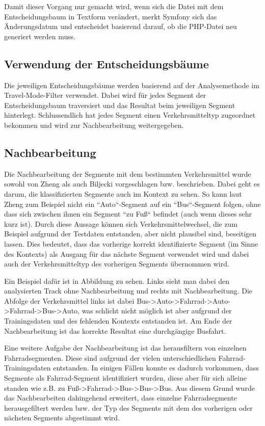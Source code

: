 Damit dieser Vorgang nur gemacht wird, wenn sich die Datei mit dem Entscheidungsbaum in Textform verändert, merkt Symfony sich das Änderungsdatum und entscheidet basierend darauf, ob die PHP-Datei neu generiert werden muss.

\subsection{Verwendung der Entscheidungsbäume}
\label{entscheidungsbaum_verwendung}
Die jeweiligen Entscheidungsbäume werden basierend auf der Analysemethode im Travel-Mode-Filter verwendet. Dabei wird für jedes Segment der Entscheidungsbaum traversiert und das Resultat beim jeweiligen Segment hinterlegt. Schlussendlich hat jedes Segment einen Verkehrsmitteltyp zugeordnet bekommen und wird zur Nachbearbeitung weitergegeben.

\subsection{Nachbearbeitung}
\label{nachbearbeitung}
Die Nachbearbeitung der Segmente mit dem bestimmten Verkehrsmittel wurde sowohl von Zheng \cite{zheng_understanding_2010} als auch Biljecki \cite{biljecki_transportation_2013} vorgeschlagen bzw. beschrieben. Dabei geht es darum, die klassifizierten Segmente auch im Kontext zu sehen. So kann laut Zheng \cite{zheng_understanding_2010} zum Beispiel nicht ein ``Auto``-Segment auf ein ``Bus``-Segment folgen, ohne dass sich zwischen ihnen ein Segment ``zu Fuß`` befindet (auch wenn dieses sehr kurz ist). Durch diese Aussage können sich Verkehrsmittelwechsel, die zum Beispiel aufgrund der Testdaten entstanden, aber nicht plausibel sind, beseitigen lassen. Dies bedeutet, dass das vorherige korrekt identifizierte Segment (im Sinne des Kontexts) als Ausgang für das nächste Segment verwendet wird und dabei auch der Verkehrsmitteltyp des vorherigen Segments übernommen wird. 

Ein Beispiel dafür ist in Abbildung  zu sehen. Links sieht man dabei den analysierten Track ohne Nachbearbeitung und rechts mit Nachbearbeitung. Die Abfolge der Verkehrsmittel links ist dabei Bus->Auto->Fahrrad->Auto->Fahrrad->Bus->Auto, was schlicht nicht möglich ist aber aufgrund der Trainingsdaten und des fehlenden Kontexts entstanden ist. Am Ende der Nachbearbeitung ist das korrekte Resultat eine durchgängige Busfahrt. 


Eine weitere Aufgabe der Nachbearbeitung ist das herausfiltern von einzelnen Fahrradsegmenten. Diese sind aufgrund der vielen unterschiedlichen Fahrrad-Trainingsdaten entstanden. In einigen Fällen konnte es dadurch vorkommen, dass Segmente als Fahrrad-Segment identifiziert wurden, diese aber für sich alleine standen wie z.B. zu Fuß->Fahrrad->Bus->Bus->Bus. Aus diesem Grund wurde das Nachbearbeiten dahingehend erweitert, dass einzelne Fahrradsegmente herausgefiltert werden bzw. der Typ des Segments mit dem des vorherigen oder nächsten Segments abgestimmt wird.
\clearpage